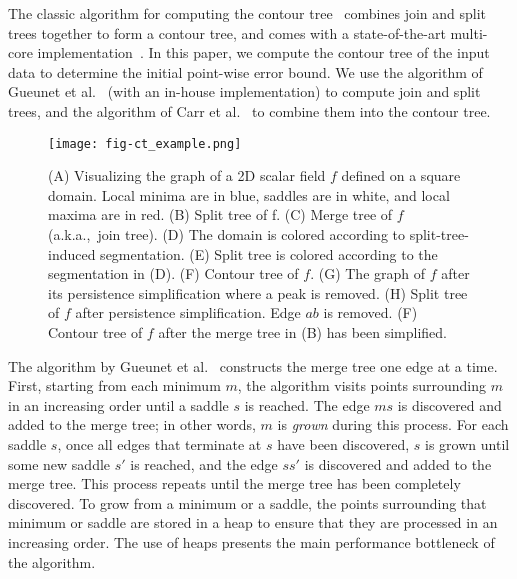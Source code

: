The classic algorithm for computing the contour tree~\cite{carr2003computing} combines join and split trees together to form a contour tree, and comes with a state-of-the-art multi-core implementation~\cite{gueunet2017task}.
In this paper, we compute the contour tree of the input data to determine the initial point-wise error bound. We use the algorithm of Gueunet et al.~\cite{gueunet2017task} (with an in-house implementation) to compute join and split trees, and the algorithm of Carr et al.~\cite{carr2003computing} to combine them into the contour tree. 

\begin{figure}[!ht]
    \centering
    \texttt{[image: fig-ct\_example.png]}
    \vspace{-6mm}
    \caption{(A) Visualizing the graph of a 2D scalar field $f$ defined on a square domain. Local minima are in blue, saddles are in white, and local maxima are in red. (B) Split tree of f.  (C) Merge tree of $f$ (a.k.a.,~join tree). (D) The domain is colored according to split-tree-induced segmentation. (E) Split tree is colored according to the segmentation in (D). (F) Contour tree of $f$. (G) The graph of $f$ after its persistence simplification where a peak is removed. (H) Split tree of $f$ after persistence simplification. Edge $ab$ is removed. (F) Contour tree of $f$ after the merge tree in (B) has been simplified. }
    \label{fig:contour-tree}
    \vspace{-6mm}
\end{figure}

The algorithm by Gueunet et al.~\cite{gueunet2017task} constructs the merge tree one edge at a time. First, starting from each minimum $m$, the algorithm visits points surrounding $m$ in an increasing order until a saddle $s$ is reached. The edge $ms$ is discovered and added to the merge tree; in other words, $m$ is \emph{grown} during this process.  
For each saddle $s$, once all edges that terminate at $s$ have been discovered, $s$ is grown until some new saddle $s'$ is reached, and the edge $ss'$ is discovered and added to the merge tree. This process repeats until the merge tree has been completely discovered. 
To grow from a minimum or a saddle, the points surrounding that minimum or saddle are stored in a heap to ensure that they are processed in an increasing order. The use of heaps presents the main performance bottleneck of the algorithm.

